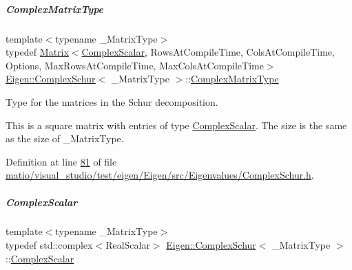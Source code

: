 \mbox{\label{group___eigenvalues___module_af61fe57877d51cfb50178f78534042f0}} 
\subparagraph{\texorpdfstring{Complex\+Matrix\+Type}{ComplexMatrixType}\hspace{0.1cm}{\footnotesize\ttfamily [2/2]}}
{\footnotesize\ttfamily template$<$typename \+\_\+\+Matrix\+Type$>$ \\
typedef \hyperlink{group___core___module_class_eigen_1_1_matrix}{Matrix}$<$\hyperlink{group___eigenvalues___module_ae1a4713b53f821867fbad617e426832a}{Complex\+Scalar}, Rows\+At\+Compile\+Time, Cols\+At\+Compile\+Time, Options, Max\+Rows\+At\+Compile\+Time, Max\+Cols\+At\+Compile\+Time$>$ \hyperlink{group___eigenvalues___module_class_eigen_1_1_complex_schur}{Eigen\+::\+Complex\+Schur}$<$ \+\_\+\+Matrix\+Type $>$\+::\hyperlink{group___eigenvalues___module_af61fe57877d51cfb50178f78534042f0}{Complex\+Matrix\+Type}}



Type for the matrices in the Schur decomposition. 

This is a square matrix with entries of type \hyperlink{group___eigenvalues___module_ae1a4713b53f821867fbad617e426832a}{Complex\+Scalar}. The size is the same as the size of {\ttfamily \+\_\+\+Matrix\+Type}. 

Definition at line \hyperlink{matio_2visual__studio_2test_2eigen_2_eigen_2src_2_eigenvalues_2_complex_schur_8h_source_l00081}{81} of file \hyperlink{matio_2visual__studio_2test_2eigen_2_eigen_2src_2_eigenvalues_2_complex_schur_8h_source}{matio/visual\+\_\+studio/test/eigen/\+Eigen/src/\+Eigenvalues/\+Complex\+Schur.\+h}.

\mbox{\label{group___eigenvalues___module_ae1a4713b53f821867fbad617e426832a}} 
\subparagraph{\texorpdfstring{Complex\+Scalar}{ComplexScalar}\hspace{0.1cm}{\footnotesize\ttfamily [1/2]}}
{\footnotesize\ttfamily template$<$typename \+\_\+\+Matrix\+Type$>$ \\
typedef std\+::complex$<$Real\+Scalar$>$ \hyperlink{group___eigenvalues___module_class_eigen_1_1_complex_schur}{Eigen\+::\+Complex\+Schur}$<$ \+\_\+\+Matrix\+Type $>$\+::\hyperlink{group___eigenvalues___module_ae1a4713b53f821867fbad617e426832a}{Complex\+Scalar}}



